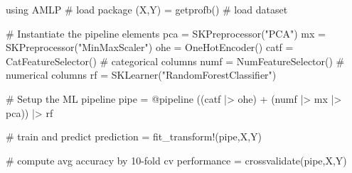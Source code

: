 using AMLP           # load package
(X,Y) = getprofb()   # load dataset

# Instantiate the pipeline elements
pca  = SKPreprocessor("PCA") 
mx   = SKPreprocessor("MinMaxScaler")  
ohe  = OneHotEncoder()
catf = CatFeatureSelector()  # categorical columns
numf = NumFeatureSelector()  # numerical columns
rf   = SKLearner("RandomForestClassifier")

# Setup the ML pipeline 
pipe = @pipeline ((catf |> ohe) + (numf |> mx |> pca)) |> rf

# train and predict
prediction = fit_transform!(pipe,X,Y) 
 
# compute avg accuracy by 10-fold cv
performance = crossvalidate(pipe,X,Y)  
